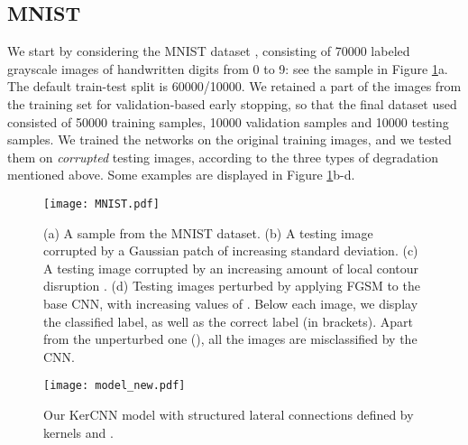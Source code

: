 \documentclass[11pt,oneside,reqno]{amsart}
\begin{document}
 
 \subsection{MNIST}\label{resmnist}
 We start by considering the MNIST dataset \citep{mnist}, consisting of 70000 labeled  grayscale images of handwritten digits from 0 to 9: see the sample in Figure \ref{MNIST}a. The default train-test split is 60000/10000. We retained a part of the images from the training set for validation-based early stopping, so that the final dataset used consisted of 50000 training samples, 10000 validation samples and 10000 testing samples. We trained the networks on the original training images, and we tested them on \emph{corrupted} testing images, according to the three types of degradation mentioned above. Some examples are displayed in Figure \ref{MNIST}b-d. 
 \begin{figure}[htbp!]
 \centering
 \texttt{[image: MNIST.pdf]}
 \caption{(a) A sample from the MNIST dataset. (b) A testing image corrupted by a Gaussian patch of increasing standard deviation. (c) A testing image corrupted by an increasing amount of local contour disruption . (d) Testing images perturbed by applying FGSM to the base CNN, with increasing values of . Below each image, we display the classified label, as well as the correct label (in brackets). Apart from the unperturbed one (), all the images are misclassified by the CNN.}\label{MNIST}
 \end{figure}

 \begin{figure}[htbp!]
 \centering
 \texttt{[image: model\_new.pdf]}
 \caption{Our KerCNN model with structured lateral connections defined by kernels  and .}\label{model}
 \end{figure}
\end{document}
